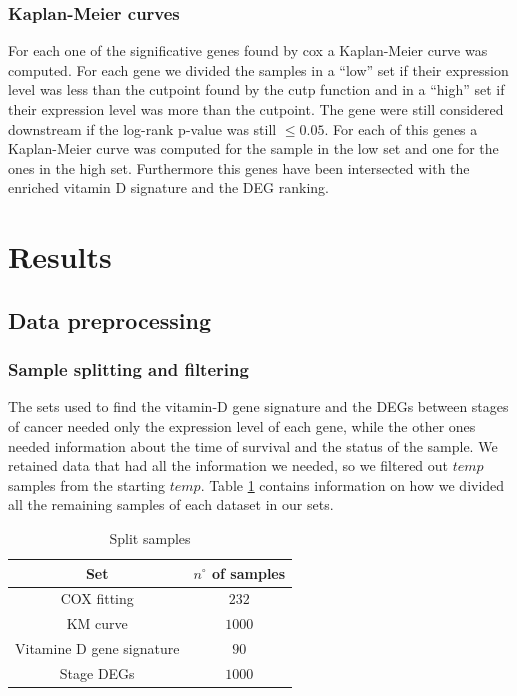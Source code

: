 \documentclass[fleqn,10pt]{SelfArx} %
\begin{document}
		\subsubsection{Kaplan-Meier curves}
			For each one of the significative genes found by cox a Kaplan-Meier curve was computed.
			For each gene we divided the samples in a ``low'' set if their expression level was less than the cutpoint found by the cutp function and in a ``high'' set if their expression level was more than the cutpoint.
			The gene were still considered downstream if the log-rank p-value was still $\le0.05$.
			For each of this genes a Kaplan-Meier curve was computed for the sample in the low set and one for the ones in the high set.
			Furthermore this genes have been intersected with the enriched vitamin D signature and the DEG ranking.


\section{Results}

	\subsection{Data preprocessing}

		\subsubsection{Sample splitting and filtering}
		The sets used to find the vitamin-D gene signature and the DEGs between stages of cancer needed only the expression level of each gene, while the other ones needed information about the time of survival and the status of the sample.
		We retained data that had all the information we needed, so we filtered out $temp$ samples from the starting $temp$.
		Table \ref{tab:samples_split} contains information on how we divided all the remaining samples of each dataset in our sets.

		\begin{table}[H]
			\centering
			\begin{tabular}{cc}
				\hline
				Set & $n^\circ$ of samples\\
				\hline
				COX fitting & $232$\\
				KM curve & $1000$\\
				Vitamine D gene signature & $90$\\
				Stage DEGs & $1000$\\
				\hline
			\end{tabular}
			\caption{Split samples}
			\label{tab:samples_split}
		\end{table}
\end{document}
